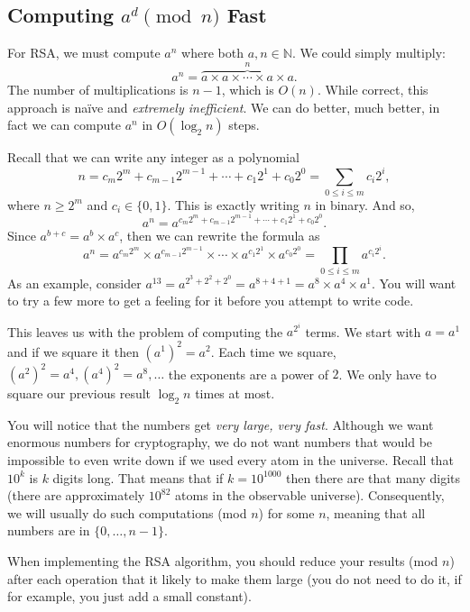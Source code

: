 \subsection{Computing $a^d \pmod{n}$ Fast}
For RSA, we must
compute $a^n$ where both $a, n \in \mathbb{N}$.
We could simply multiply:
$$
a^n = \overbrace{a \times a \times \cdots \times a \times a}^n .
$$
The number of multiplications is $n-1$, which is ${O}(n)$.
While correct, this approach is na{\"{i}}ve and \emph{extremely inefficient}.
We can do better, much better, in fact we can compute $a^n$ in ${O} (\log_2 n)$ steps.

Recall that we can write any integer as a polynomial
$$
n
= c_m 2^m + c_{m-1} 2^{m-1} + \cdots + c_1 2^1 + c_0 2^0
= \sum_{0\le i \le m} c_i 2^i ,
$$
where $n \ge 2^m$ and $c_i \in \{0, 1\}$. This is exactly writing $n$ in
binary. And so,
$$
a^n = a^{c_m 2^m + c_{m-1} 2^{m-1} + \cdots + c_1 2^1 + c_0 2^0} .
$$
Since $a^{b+c} = a^b \times a^c$, then we can rewrite the formula as
$$
a^n =
a^{c_m 2^m} \times a^{c_{m-1} 2^{m-1}} \times \cdots \times a^{c_1 2^1} \times a^{c_0 2^0} =
\prod_{0\le i \le m} a^{c_i 2^i} .
$$
As an example, consider
$a^{13} = a^{2^3 + 2^2 + 2^0} = a^{8 + 4 + 1} = a^8 \times a^4 \times a^1$.
You will want to try a few more to get a feeling for it before you attempt to write code.

This leaves us with the problem of computing the $a^{2^i}$ terms.
We start with $a = a^1$ and if we square it then $(a^1)^2 = a^2$. Each time we square,
$(a^2)^2 = a^4, (a^4)^2 = a^8, \ldots$ the exponents are a power of $2$. We only have to square our previous result $\log_2 n$ times at most.

You will notice that the numbers get \emph{very large, very fast}.
Although we want enormous numbers for cryptography, we do not want
numbers that would be impossible to even write down if we used every
atom in the universe. Recall that $10^k$ is $k$ digits long. That
means that if $k=10^{1000}$ then there are that many digits
(there are approximately $10^{82}$ atoms in the observable universe).
Consequently,
we will usually do such computations
(mod ${n}$) for some $n$, meaning that all numbers are in $\{0, \ldots, n-1\}$.

When implementing the RSA algorithm, you should reduce your results (mod ${n}$) after each operation that it likely to make them large (you do not need to do it, if for example, you just add a small constant).
